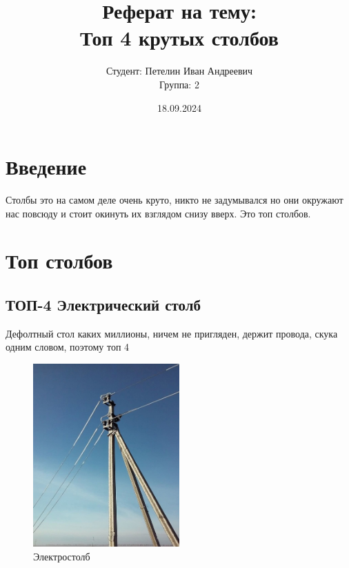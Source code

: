 \documentclass[14pt]{extreport}
\begin{document}
    
    \title{Реферат на тему: \\[0.5cm] \textbf{Топ 4 крутых столбов}}
    \author{Студент: Петелин Иван Андреевич \\ Группа: 2}
    \date{18.09.2024}
    
    \maketitle
    
    \chapter{Введение}
    Столбы это на самом деле очень круто, никто не задумывался но они окружают нас повсюду и стоит окинуть их взглядом снизу вверх. Это топ столбов.
    \chapter{Топ столбов}
    \section{ТОП-4 Электрический столб}
        Дефолтный стол каких миллионы, ничем не пригляден, держит провода, скука одним словом, поэтому топ 4
    \begin{figure}[h]
                \centering
                \includegraphics[width=0.5\textwidth]{elctro.jpg}
                \caption{Электростолб}
                \label{fig:example1}
            \end{figure}
            
\end{document}
